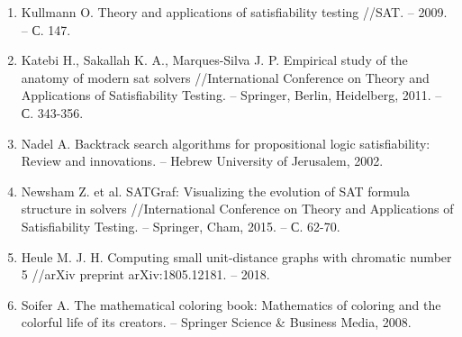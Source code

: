 \begin{enumerate}[leftmargin=0.5cm,topsep=0pt,itemsep=-1ex,partopsep=1ex,parsep=1ex,label=\arabic{*}.]
\item
Kullmann O. Theory and applications of satisfiability testing //SAT. – 2009. – С. 147.

\item
Katebi H., Sakallah K. A., Marques-Silva J. P. Empirical study of the anatomy of modern sat solvers //International Conference on Theory and Applications of Satisfiability Testing. – Springer, Berlin, Heidelberg, 2011. – С. 343-356.

\item
Nadel A. Backtrack search algorithms for propositional logic satisfiability: Review and innovations. – Hebrew University of Jerusalem, 2002.


\item
Newsham Z. et al. SATGraf: Visualizing the evolution of SAT formula structure in solvers //International Conference on Theory and Applications of Satisfiability Testing. – Springer, Cham, 2015. – С. 62-70.

\item
Heule M. J. H. Computing small unit-distance graphs with chromatic number 5 //arXiv preprint arXiv:1805.12181. – 2018.

\item
Soifer A. The mathematical coloring book: Mathematics of coloring and the colorful life of its creators. – Springer Science \& Business Media, 2008.

\end{enumerate}